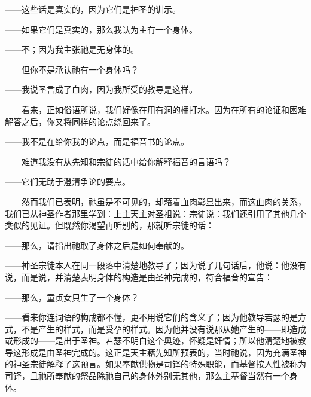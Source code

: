 ——这些话是真实的，因为它们是神圣的训示。\par

——如果它们是真实的，那么我认为主有一个身体。\par

——不；因为我主张祂是无身体的。\par

——但你不是承认祂有一个身体吗？\par

——我说圣言成了血肉，因为我所受的教导是这样。\par

——看来，正如俗语所说，我们好像在用有洞的桶打水。因为在所有的论证和困难解答之后，你又将同样的论点绕回来了。\par

——我不是在给你我的论点，而是福音书的论点。\par

——难道我没有从先知和宗徒的话中给你解释福音的言语吗？\par

——它们无助于澄清争论的要点。\par

——然而我们已表明，祂虽是不可见的，却藉着血肉彰显出来，而这血肉的关系，我们已从神圣作者那里学到：上主天主对圣祖说：宗徒说：我们还引用了其他几个类似的见证。但既然你渴望再听别的，那就听宗徒的话：\par

——那么，请指出祂取了身体之后是如何奉献的。\par

——神圣宗徒本人在同一段落中清楚地教导了；因为说了几句话后，他说：他没有说，而是说，并清楚表明身体的构造是由圣神完成的，符合福音的宣告：\par

——那么，童贞女只生了一个身体？\par

——看来你连词语的构成都不懂，更不用说它们的含义了；因为他教导若瑟的是方式，不是产生的样式，而是受孕的样式。因为他并没有说那从她产生的——即造成或形成的——是出于圣神。若瑟不明白这个奥迹，怀疑是奸情；所以他清楚地被教导这形成是由圣神完成的。这正是天主藉先知所预表的，当时祂说，因为充满圣神的神圣宗徒解释了这预言。如果奉献供物是司铎的特殊职能，而基督按人性被称为司铎，且祂所奉献的祭品除祂自己的身体外别无其他，那么主基督当然有一个身体。\par


